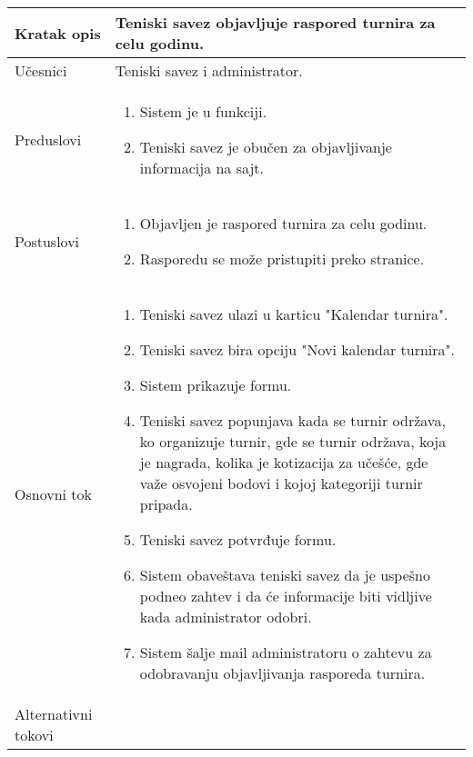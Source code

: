 \documentclass{article}
\begin{document}
    \begin{longtable}{| p{} | p{} |} 
        \hline
            Kratak opis & Teniski savez objavljuje raspored turnira za celu godinu.\\ 
        \hline    
            Učesnici & Teniski savez i administrator.\\
        \hline
            Preduslovi & 
                \begin{enumerate}
                    \item Sistem je u funkciji.
                    \item Teniski savez je obučen za objavljivanje informacija na sajt.
                \end{enumerate}\\
        \hline  
            Postuslovi & 
                \begin{enumerate}
                    \item Objavljen je raspored turnira za celu godinu.
                    \item Rasporedu se može pristupiti preko stranice.
                \end{enumerate}\\
        \hline
            Osnovni tok & 
                \begin{enumerate}
                    \item Teniski savez ulazi u karticu "Kalendar turnira".
                    \item Teniski savez bira opciju "Novi kalendar turnira".
                    \item Sistem prikazuje formu.
                    \item Teniski savez popunjava kada se turnir održava, ko organizuje turnir, gde se turnir održava, koja je nagrada, kolika je kotizacija za učešće, gde važe osvojeni bodovi i kojoj kategoriji turnir pripada. 
                    \item Teniski savez potvrđuje formu.
                    \item Sistem obaveštava teniski savez da je uspešno podneo zahtev i da će informacije biti vidljive kada administrator odobri.
                    \item Sistem šalje mail administratoru o zahtevu za odobravanju objavljivanja rasporeda turnira.
                \end{enumerate}\\
        \hline
            Alternativni tokovi & 
                \begin{itemize}

\end{itemize}
\end{longtable}
\end{document}
